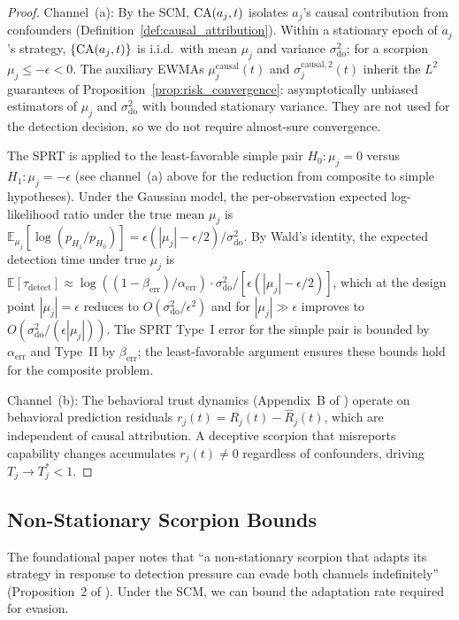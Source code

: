 \begin{proof}
Channel~(a): By the SCM, $\mathrm{CA}(a_j, t)$ isolates $a_j$'s causal
contribution from confounders
(Definition~\ref{def:causal_attribution}). Within a stationary epoch
of $a_j$'s strategy, $\{\mathrm{CA}(a_j, t)\}$ is i.i.d.\ with mean
$\mu_j$ and variance $\sigma_{\mathrm{do}}^2$; for a scorpion
$\mu_j \leq -\epsilon < 0$. The auxiliary EWMAs
$\mu_j^{\mathrm{causal}}(t)$ and $\sigma_j^{\mathrm{causal},2}(t)$
inherit the $L^2$ guarantees of
Proposition~\ref{prop:risk_convergence}: asymptotically unbiased
estimators of $\mu_j$ and $\sigma_{\mathrm{do}}^2$ with bounded
stationary variance. They are not used for the detection decision,
so we do not require almost-sure convergence.

The SPRT is applied to the least-favorable simple pair
$H_0: \mu_j = 0$ versus $H_1: \mu_j = -\epsilon$
(see channel~(a) above for the reduction from composite to simple
hypotheses). Under the Gaussian model, the per-observation expected
log-likelihood ratio under the true mean $\mu_j$ is
$\mathbb{E}_{\mu_j}[\log(p_{H_1}/p_{H_0})] =
\epsilon(|\mu_j| - \epsilon/2) / \sigma_{\mathrm{do}}^2$. By Wald's
identity, the expected detection time under true $\mu_j$ is
$\mathbb{E}[\tau_{\mathrm{detect}}] \approx
\log((1 - \beta_{\mathrm{err}}) / \alpha_{\mathrm{err}}) \cdot
\sigma_{\mathrm{do}}^2 /
[\epsilon(|\mu_j| - \epsilon/2)]$, which at the design point
$|\mu_j| = \epsilon$ reduces to $O(\sigma_{\mathrm{do}}^2 / \epsilon^2)$
and for $|\mu_j| \gg \epsilon$ improves to
$O(\sigma_{\mathrm{do}}^2 / (\epsilon |\mu_j|))$.
The SPRT Type~I error for the simple pair is bounded by
$\alpha_{\mathrm{err}}$ and Type~II by $\beta_{\mathrm{err}}$; the
least-favorable argument ensures these bounds hold for the
composite problem.

Channel~(b): The behavioral trust dynamics (Appendix~B of
\citet{lasser2026gfm}) operate on behavioral prediction residuals
$r_j(t) = R_j(t) - \hat{R}_j(t)$, which are independent of causal
attribution. A deceptive scorpion that misreports capability changes
accumulates $r_j(t) \neq 0$ regardless of confounders, driving
$T_j \to T_j^* < 1$.
\end{proof}

\subsection{Non-Stationary Scorpion Bounds}

The foundational paper notes that ``a non-stationary scorpion that adapts its strategy in
response to detection pressure can evade both channels indefinitely''
(Proposition~2 of \citet{lasser2026gfm}). Under the SCM, we can bound the
adaptation rate required for evasion.

